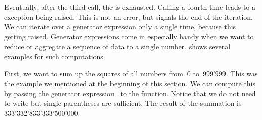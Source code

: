 Eventually, after the third  call, the  is exhausted.
Calling  a fourth time leads to a  exception being raised.
This is not an error, but signals the end of the iteration.
We can iterate over a generator expression only a single time, because this  getting raised.%
%
%
%
%
%
Generator expressions come in especially handy when we want to reduce or aggregate a sequence of data to a single number.
 shows several examples for such computations.

First, we want to sum up the squares of all numbers from~0 to~999'999.
This was the example we mentioned at the beginning of this section.
We can compute this by passing the generator expression~ to the  function.
Notice that we do not need to write  but single parentheses are sufficient.
The result of the summation is 333'332'833'333'500'000.

